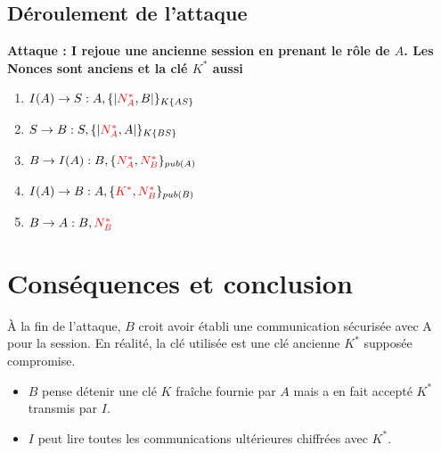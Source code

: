 \documentclass[11pt]{article}
\begin{document}
\subsection{Déroulement de l'attaque}

\textbf{Attaque : I rejoue une ancienne session en prenant le rôle de $A$. Les Nonces sont anciens et la clé $K^*$ aussi}

\begin{enumerate}
    \item $I(A) \rightarrow S : A, \{|\textcolor{red}{N_A^*},B|\}_{K\{AS\}}$
    \item $S \rightarrow B : S, \{|\textcolor{red}{N_A^*},A|\}_{K\{BS\}}$
    \item $B \rightarrow I(A) : B, \{\textcolor{red}{N_A^*},\textcolor{red}{N_B^*}\}_{pub(A)}$
    \item $I(A) \rightarrow B : A, \{\textcolor{red}{K^*},\textcolor{red}{N_B^*}\}_{pub(B)}$
    \item $B \rightarrow A : B,\textcolor{red}{N_B^*}$
\end{enumerate}


\section{Conséquences et conclusion}

\noindent
À la fin de l'attaque, $B$ croit avoir établi une communication sécurisée avec A pour la session. En réalité, la clé utilisée est une clé ancienne $K^*$ supposée compromise.

\begin{itemize}
    \item $B$ pense détenir une clé $K$ fraîche fournie par $A$ mais a en fait accepté $K^*$ transmis par $I$.
    \item $I$ peut lire toutes les communications ultérieures chiffrées avec $K^*$.
\end{itemize}
\end{document}
